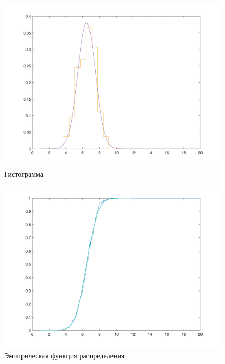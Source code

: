 \documentclass[12pt, a4paper]{report}
\begin{document}
	\newpage


	\begin{figure}[H]
		\centering
		\includegraphics[scale=0.52]{img/Gistogramma.png}
		\caption{Гистограмма}
	\end{figure}

	\newpage
	
	\begin{figure}[H]
		\centering
		\includegraphics[scale=0.52]{img/EmpericalFunc.png}
		\caption{Эмпирическая функция распределения}
	\end{figure}
	
	
		
	
\end{document}
